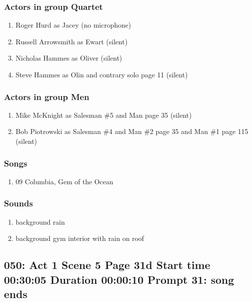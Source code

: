 \subsubsection{Actors in group Quartet}
\begin{enumerate}
\item Roger Hurd as Jacey (no microphone)
\item Russell Arrowsmith as Ewart (silent)
\item Nicholas Hammes as Oliver (silent)
\item Steve Hammes as Olin and contrary solo page 11 (silent)
\end{enumerate}
\subsubsection{Actors in group Men}
\begin{enumerate}
\item Mike McKnight as Salesman \#5 and Man page 35 (silent)
\item Bob Piotrowski as Salesman \#4 and Man \#2 page 35 and Man \#1 page 115 (silent)
\end{enumerate}

\subsubsection{Songs}
\begin{enumerate}
\item 09 Columbia, Gem of the Ocean
\end{enumerate}\subsubsection{Sounds}
\begin{enumerate}
\item background rain
\item background gym interior with rain on roof
\end{enumerate}
\subsection{050: Act 1 Scene 5 Page 31d Start time 00:30:05 Duration 00:00:10 Prompt 31: song ends}

